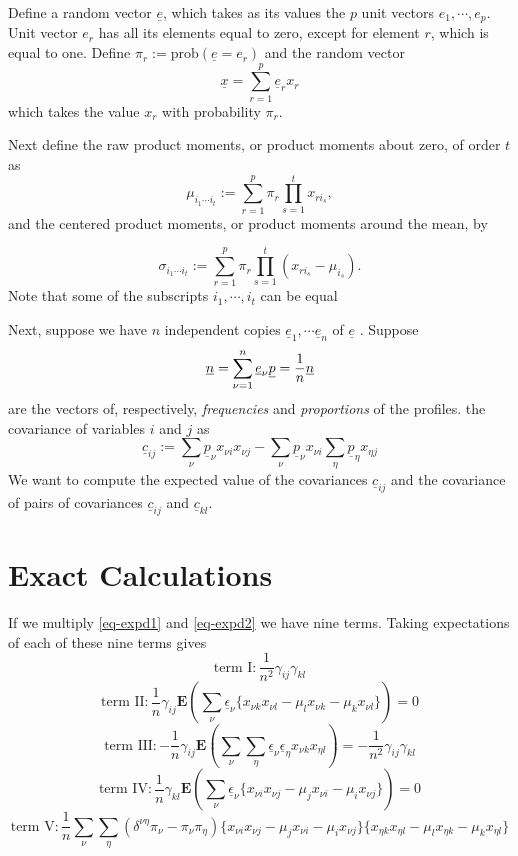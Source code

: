 \documentclass[
  12pt,
  letterpaper,
  DIV=11,
  numbers=noendperiod]{scrartcl}
\newcommand{\ul}[1]{\underline{#1}}
\begin{document}
Define a random vector \(\ul{e}\), which takes as its values the \(p\)
unit vectors \(e_1,\cdots,e_p\). Unit vector \(e_r\) has all its
elements equal to zero, except for element \(r\), which is equal to one.
Define \(\pi_r:=\text{prob}(\ul{e}=e_r)\) and the random vector \[
\ul{x}=\sum_{r=1}^p\ul{e}_rx_r
\] which takes the value \(x_r\) with probability \(\pi_r\).

Next define the raw product moments, or product moments about zero, of
order \(t\) as \[
\mu_{i_1\cdots i_t}:=\sum_{r=1}^p \pi_r\prod_{s=1}^tx_{ri_s},
\] and the centered product moments, or product moments around the mean,
by

\[
\sigma_{i_1\cdots i_t}:=\sum_{r=1}^p \pi_r\prod_{s=1}^t(x_{ri_s}-\mu_{i_s}).
\] Note that some of the subscripts \(i_1,\cdots,i_t\) can be equal

Next, suppose we have \(n\) independent copies
\(\ul{e}_1,\cdots\ul{e}_n\) of \(\ul{e}\) . Suppose \[
\ul{n}=\sum_{\nu=1}^n\ul{e}_\nu\\
\ul{p}=\frac{1}{n}\ul{n}
\] are the vectors of, respectively, \emph{frequencies} and
\emph{proportions} of the profiles. the covariance of variables \(i\)
and \(j\) as \[
\ul{c}_{ij}:=\sum_\nu \ul{p}_\nu x_{\nu i}x_{\nu j}-\sum_\nu \ul{p}_\nu x_{\nu i}\sum_\eta\ul{p}_\eta x_{\eta j}
\] We want to compute the expected value of the covariances
\(\ul{c}_{ij}\) and the covariance of pairs of covariances
\(\ul{c}_{ij}\) and \(\ul{c}_{kl}\).

\section{Exact Calculations}\label{exact-calculations}

If we multiply \eqref{eq-expd1} and \eqref{eq-expd2} we have nine terms.
Taking expectations of each of these nine terms gives \[
\text{term I}:\frac{1}{n^2}\gamma_{ij}\gamma_{kl}
\] \[
\text{term II}:\frac{1}{n}\gamma_{ij}\mathbf{E}(\sum_\nu\ul{\epsilon}_\nu\{x_{\nu k}x_{\nu l}
-\mu_lx_{\nu k}-\mu_kx_{\nu l}\})=0
\] \[
\text{term III}:-\frac{1}{n}\gamma_{ij}\mathbf{E}(\sum_\nu\sum_\eta\ul{\epsilon}_\nu\ul{\epsilon}_\eta x_{\nu k}x_{\eta l})=-\frac{1}{n^2}\gamma_{ij}\gamma_{kl}
\] \[
\text{term IV}:\frac{1}{n}\gamma_{kl}\mathbf{E}(\sum_\nu\ul{\epsilon}_\nu\{x_{\nu i}x_{\nu j}
-\mu_jx_{\nu i}-\mu_ix_{\nu j}\})=0
\] \[
\text{term V}:\frac{1}{n}\sum_\nu\sum_\eta(\delta^{\nu\eta}\pi_\nu-\pi_\nu\pi_\eta)\{x_{\nu i}x_{\nu j}
-\mu_jx_{\nu i}-\mu_ix_{\nu j}\}\{x_{\eta k}x_{\eta l}
-\mu_lx_{\eta k}-\mu_kx_{\eta l}\}
\]
\end{document}
